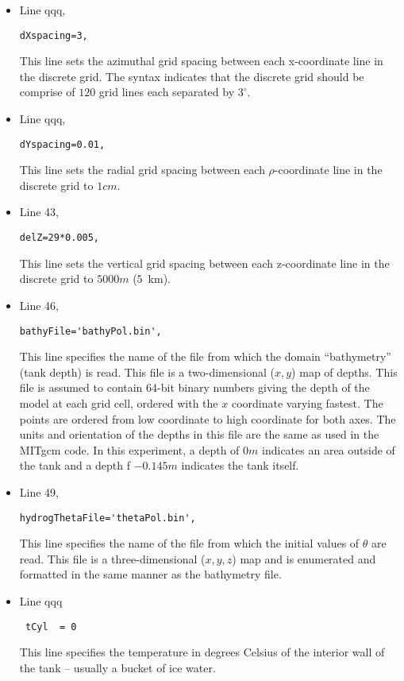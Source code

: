 \begin{itemize}
\item Line qqq,
\begin{verbatim}
dXspacing=3,
\end{verbatim}
This line sets the azimuthal grid spacing between each x-coordinate line
in the discrete grid. The syntax indicates that the discrete grid
should be comprise of $120$ grid lines each separated by $3^{\circ}$.
                                                                                


\item Line qqq,
\begin{verbatim}
dYspacing=0.01,
\end{verbatim}
This line sets the radial grid spacing between each $\rho$-coordinate line
in the discrete grid to $1cm$.

\item Line 43,
\begin{verbatim}
delZ=29*0.005,
\end{verbatim}
This line sets the vertical grid spacing between each z-coordinate line
in the discrete grid to $5000m$ ($5$~km).

\item Line 46,
\begin{verbatim}
bathyFile='bathyPol.bin',
\end{verbatim}
This line specifies the name of the file from which the domain
``bathymetry'' (tank depth) is read. This file is a two-dimensional 
($x,y$) map of
depths. This file is assumed to contain 64-bit binary numbers 
giving the depth of the model at each grid cell, ordered with the $x$ 
coordinate varying fastest. The points are ordered from low coordinate
to high coordinate for both axes.  The units and orientation of the
depths in this file are the same as used in the MITgcm code. In this
experiment, a depth of $0m$ indicates an area outside of the tank
and a depth
f $-0.145m$ indicates the tank itself. 

\item Line 49,
\begin{verbatim}
hydrogThetaFile='thetaPol.bin',
\end{verbatim}
This line specifies the name of the file from which the initial values 
of $\theta$ 
are read. This file is a three-dimensional
($x,y,z$) map and is enumerated and formatted in the same manner as the 
bathymetry file. 

\item Line qqq
\begin{verbatim}
 tCyl  = 0
\end{verbatim}
This line specifies the temperature in degrees Celsius of the interior
wall of the tank -- usually a bucket of ice water.


\end{itemize}

